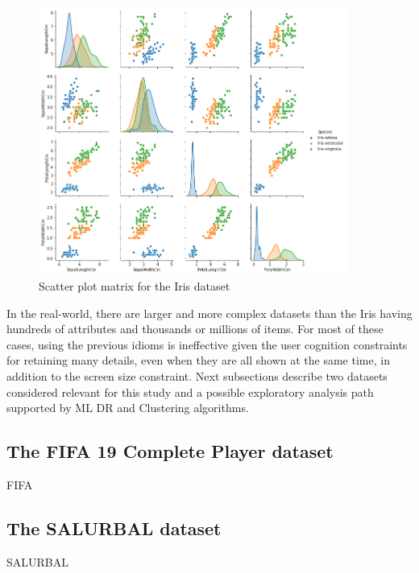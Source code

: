 \begin{figure}[ht]
 \centering
 \includegraphics[width=0.9\textwidth]{iris-scatterplot.png}
 \caption{Scatter plot matrix for the Iris dataset \cite{FisherIris}}
 \label{fig:iris-scatterplot}
\end{figure}

In the real-world, there are larger and more complex datasets than the Iris having hundreds of attributes and thousands or millions of items. For most of these cases, using the previous idioms is ineffective given the user cognition constraints for retaining many details, even when they are all shown at the same time, in addition to the screen size constraint. Next subsections describe two datasets considered relevant for this study and a possible exploratory analysis path supported by ML DR and Clustering algorithms.

\subsection{The FIFA 19 Complete Player dataset} %
\label{subsection1.1.1}

FIFA

\subsection{The SALURBAL dataset} %
\label{subsection1.1.2}

SALURBAL

